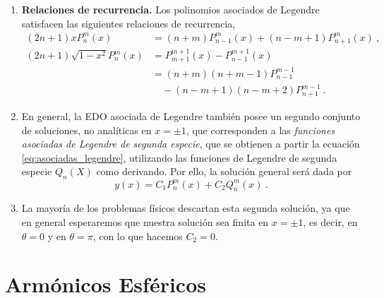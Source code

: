 \begin{propiedad}
\begin{enumerate}[resume=asociadas]
        \item \textbf{Relaciones de recurrencia.} Los polinomios asociados de Legendre satisfacen las siguientes relaciones de recurrencia,
        \begin{align}
            (2n+1)x P_n^m(x) & = (n+m) P^m_{n-1}(x) + (n-m+1) P^m_{n+1}(x) \ , \\
            (2n+1) \sqrt{1-x^2} P_n^m(x) & = P^{m+1}_{m+1}(x) - P^{m+1}_{n-1}(x) \\
            & = (n+m)(n+m-1)P^{m-1}_{n-1} \nonumber \\
            & \quad - (n-m+1)(n-m+2)P^{m-1}_{n+1} \ .
        \end{align}

        \item En general, la EDO asociada de Legendre también posee un segundo conjunto de soluciones, no analíticas en $x = \pm 1$, que corresponden a las \emph{funciones asociadas de Legendre de segunda especie}, que se obtienen a partir la ecuación \eqref{eq:asociadas_legendre}, utilizando las funciones de Legendre de segunda especie $Q_n(X)$ como derivando. Por ello, la solución general será dada por
        \begin{equation}
            y(x) = C_1 P_n^m(x) + C_2 Q_n^m(x) \ .
        \end{equation}

        \item La mayoría de los problemas físicos descartan esta segunda solución, ya que en general esperaremos que nuestra solución sea finita en $x = \pm 1$, es decir, en $\theta = 0$ y en $\theta = \pi$, con lo que hacemos $C_2 = 0$.
    \end{enumerate}
\end{propiedad}

\section{Armónicos Esféricos}

